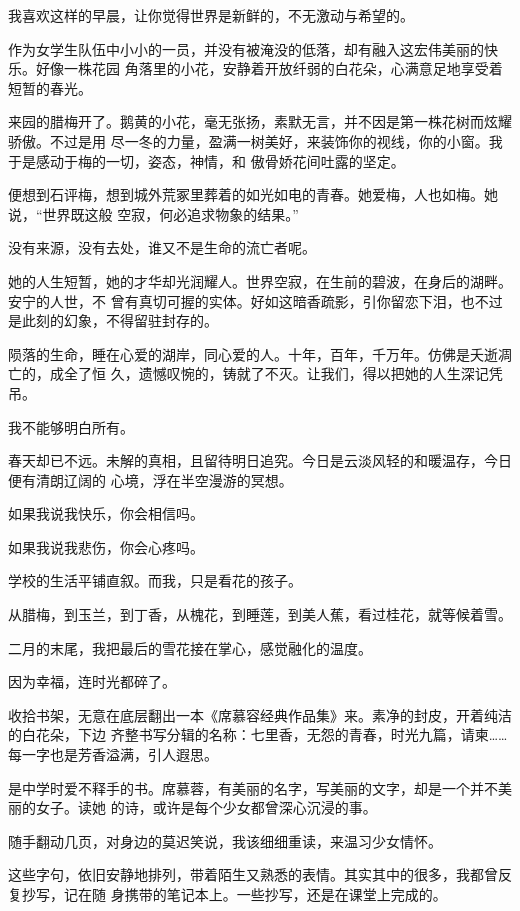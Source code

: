 		我喜欢这样的早晨，让你觉得世界是新鲜的，不无激动与希望的。

		作为女学生队伍中小小的一员，并没有被淹没的低落，却有融入这宏伟美丽的快乐。好像一株花园
	角落里的小花，安静着开放纤弱的白花朵，心满意足地享受着短暂的春光。

		来园的腊梅开了。鹅黄的小花，毫无张扬，素默无言，并不因是第一株花树而炫耀骄傲。不过是用
	尽一冬的力量，盈满一树美好，来装饰你的视线，你的小窗。我于是感动于梅的一切，姿态，神情，和
	傲骨娇花间吐露的坚定。

		便想到石评梅，想到城外荒冢里葬着的如光如电的青春。她爱梅，人也如梅。她说，“世界既这般
	空寂，何必追求物象的结果。”

		没有来源，没有去处，谁又不是生命的流亡者呢。

		她的人生短暂，她的才华却光润耀人。世界空寂，在生前的碧波，在身后的湖畔。安宁的人世，不
	曾有真切可握的实体。好如这暗香疏影，引你留恋下泪，也不过是此刻的幻象，不得留驻封存的。

		陨落的生命，睡在心爱的湖岸，同心爱的人。十年，百年，千万年。仿佛是夭逝凋亡的，成全了恒
	久，遗憾叹惋的，铸就了不灭。让我们，得以把她的人生深记凭吊。

		我不能够明白所有。

		春天却已不远。未解的真相，且留待明日追究。今日是云淡风轻的和暖温存，今日便有清朗辽阔的
	心境，浮在半空漫游的冥想。

		如果我说我快乐，你会相信吗。

		如果我说我悲伤，你会心疼吗。


		学校的生活平铺直叙。而我，只是看花的孩子。

		从腊梅，到玉兰，到丁香，从槐花，到睡莲，到美人蕉，看过桂花，就等候着雪。


		二月的末尾，我把最后的雪花接在掌心，感觉融化的温度。

		因为幸福，连时光都碎了。

	\endwriting



		收拾书架，无意在底层翻出一本《席慕容经典作品集》来。素净的封皮，开着纯洁的白花朵，下边
	齐整书写分辑的名称：七里香，无怨的青春，时光九篇，请柬…… 每一字也是芳香溢满，引人遐思。

		是中学时爱不释手的书。席慕蓉，有美丽的名字，写美丽的文字，却是一个并不美丽的女子。读她
	的诗，或许是每个少女都曾深心沉浸的事。

		随手翻动几页，对身边的莫迟笑说，我该细细重读，来温习少女情怀。

		这些字句，依旧安静地排列，带着陌生又熟悉的表情。其实其中的很多，我都曾反复抄写，记在随
	身携带的笔记本上。一些抄写，还是在课堂上完成的。

